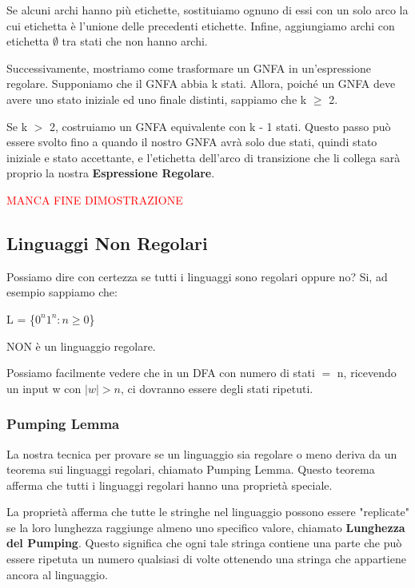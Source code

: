 \documentclass{article}
\begin{document}
Se alcuni archi hanno più etichette, sostituiamo ognuno di essi con un solo arco
la cui etichetta è l'unione delle precedenti etichette. Infine, aggiungiamo
archi con etichetta $\emptyset$ tra stati che non hanno archi. 

Successivamente, mostriamo come trasformare un GNFA in un'espressione regolare.
Supponiamo che il GNFA abbia k stati. Allora, poiché un GNFA deve avere uno
stato iniziale ed uno finale distinti, sappiamo che k $\geq$ 2. 

Se k $>$ 2, costruiamo un GNFA equivalente con k - 1 stati. Questo passo può
essere svolto fino a quando il nostro GNFA avrà solo due stati, quindi stato
iniziale e stato accettante, e l'etichetta dell'arco di transizione che li
collega sarà proprio la nostra \textbf{Espressione Regolare}.

\begin{center}
    \textcolor{red}{MANCA FINE DIMOSTRAZIONE}    
\end{center}

\subsection{Linguaggi Non Regolari}
Possiamo dire con certezza se tutti i linguaggi sono regolari oppure no? Si, ad
esempio sappiamo che:

\begin{center}
    L = \{$0^n 1^n : n \geq 0$\}

    NON è un linguaggio regolare.
\end{center}

Possiamo facilmente vedere che in un DFA con numero di stati $=$ n, ricevendo un
input w con $|w| > n$, ci dovranno essere degli stati ripetuti.

\subsubsection{Pumping Lemma}
La nostra tecnica per provare se un linguaggio sia regolare o meno deriva da un
teorema sui linguaggi regolari, chiamato Pumping Lemma. Questo teorema afferma
che tutti i linguaggi regolari hanno una proprietà speciale.

La proprietà afferma che tutte le stringhe nel linguaggio possono essere
"replicate" se la loro lunghezza raggiunge almeno uno specifico valore, chiamato
\textbf{Lunghezza del Pumping}. Questo significa che ogni tale stringa contiene
una parte che può essere ripetuta un numero qualsiasi di volte ottenendo una
stringa che appartiene ancora al linguaggio.
\end{document}
